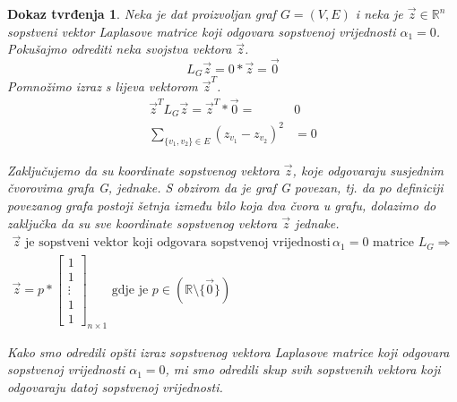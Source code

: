 \documentclass[11pt]{article}
\newtheorem*{custom_proof}{Dokaz tvrđenja}
\begin{document}
	\begin{custom_proof}
	Neka je dat proizvoljan graf $G=(V,E)$ i neka je $\vec{z} \in \mathbb{R}^n$ sopstveni vektor Laplasove matrice koji odgovara sopstvenoj vrijednosti $\alpha_1 = 0$.
	Pokušajmo odrediti neka svojstva vektora $\vec{z}$.
	\[
		L_G\vec{z} = 0 * \vec{z} = \vec{0}
	\]
	Pomnožimo izraz s lijeva vektorom $\vec{z}^T$.
	\[
		\begin{split}
			\vec{z}^T L_G \vec{z} = \vec{z}^T * \vec{0} = &0 \\
			\sum_{\{v_1,v_2\} \in E} (z_{v_1} - z_{v_2})^2 &= 0
		\end{split}
	\]
	
	Zaključujemo da su koordinate sopstvenog vektora $\vec{z}$, koje odgovaraju susjednim čvorovima grafa G, jednake.
	S obzirom da je graf G povezan, tj. da po definiciji povezanog grafa postoji šetnja između bilo koja dva čvora u grafu,
	dolazimo do zaključka da su sve koordinate sopstvenog vektora $\vec{z}$ jednake. 
	\[
	\begin{split}
	 \vec{z} \text{ je sopstveni vektor koji odgovara sopstvenoj vrijednosti } & \alpha_1 = 0 \text{ matrice }  L_G \Rightarrow \\
	 \vec{z} =p *
	\begin{bmatrix} 
	1 \\ 1 \\ \vdots \\ 1 \\ 1
	\end{bmatrix}_{n \times 1}
	\text{ gdje je } p \in (\mathbb{R} \setminus \{\vec{0}\})
	\end{split}
	\]

	Kako smo odredili opšti izraz sopstvenog vektora Laplasove matrice koji odgovara sopstvenoj vrijednosti $\alpha_1 = 0$,
	mi smo odredili skup svih sopstvenih vektora koji odgovaraju datoj sopstvenoj vrijednosti.
	

\end{custom_proof}
\end{document}
